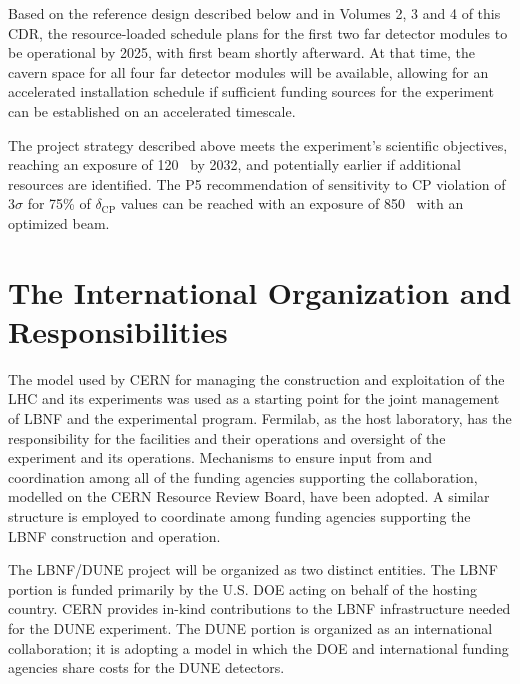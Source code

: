 Based on the reference design described below and in Volumes 2, 3 and 4 of this %
CDR, the resource-loaded schedule %
plans for the first two  far detector modules to be
operational by 2025,
with first beam shortly afterward. 
At that time, the cavern 
space for all four  far detector modules will be available, allowing for 
an accelerated installation schedule if sufficient funding sources for
the experiment can be established on an accelerated timescale.  

\vspace{6pt}
The project strategy described above meets the experiment's scientific objectives,
 reaching an exposure of 
\num{120}~\ktMWyr{} by 2032, and potentially earlier if additional resources are identified. 
The P5 recommendation of sensitivity to CP violation of 3$\sigma$ for 75\% of $\delta_\text{CP}$
values can be reached with an exposure of \num{850}~\ktMWyr{} with an optimized beam.

\section{The International Organization and Responsibilities}

The %
model used by CERN for managing the construction and exploitation of the LHC and its experiments was used as a starting point for the joint management of LBNF and the experimental program.  Fermilab, as the host laboratory, has the responsibility for the facilities and their operations 
and oversight of the experiment and its operations.  Mechanisms to ensure input from and coordination among all of the funding agencies supporting the collaboration, modelled on the CERN Resource Review Board, have been adopted. %
A similar structure is employed to coordinate among funding agencies supporting the LBNF construction and operation.  

The LBNF/DUNE project will be organized as two distinct entities. The LBNF portion is funded primarily
by the U.S. DOE acting on behalf of the hosting country.  CERN provides in-kind contributions to the LBNF infrastructure needed for the DUNE experiment. The DUNE portion is organized
as an international collaboration; it is adopting a model in which the DOE and international funding agencies share costs %
for the DUNE detectors.

